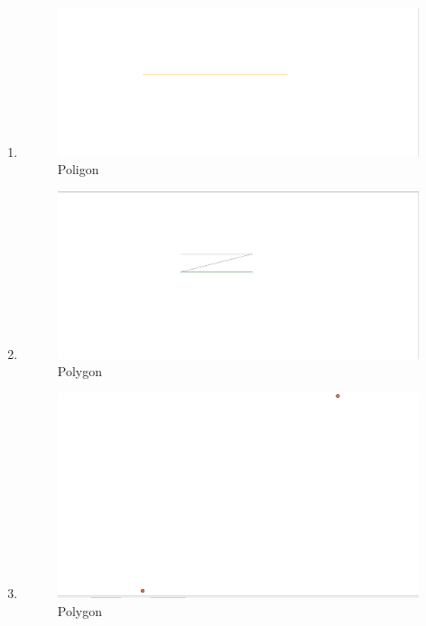 \begin{enumerate}
	\item 
	
	\begin{figure}[H]
		\includegraphics[width=12cm]{figures/1174031/2/hasil6.PNG}
		\centering
		\caption{Poligon}
	\end{figure}
	
	\item 
	
	\begin{figure}[H]
		\includegraphics[width=12cm]{figures/1174031/2/hasil7.PNG}
		\centering
		\caption{Polygon}
	\end{figure}
	
	\item 
	
	\begin{figure}[H]
		\includegraphics[width=12cm]{figures/1174031/2/hasil1.PNG}
		\centering
		\caption{Polygon}
	\end{figure}
	

\end{enumerate}
